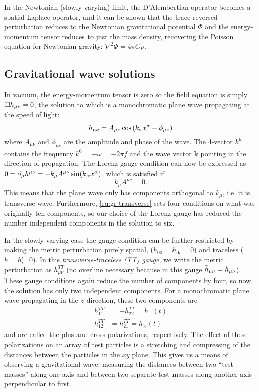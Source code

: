 In the Newtonian (slowly-varying) limit, the D'Alembertian operator becomes a spatial Laplace operator, and it can be shown that the trace-reversed perturbation reduces to the Newtonian gravitational potential $\Phi$ and the energy-momentum tensor reduces to just the mass density, recovering the Poisson equation for Newtonian gravity: $\nabla^2\Phi = 4\pi G\rho$.


\subsection{Gravitational wave solutions}

In vacuum, the energy-momentum tensor is zero so the field equation is simply $\Box\Bar{h}_{\mu\nu}=0$, the solution to which is a monochromatic plane wave propagating at the speed of light:
\begin{equation}
	\Bar{h}_{\mu\nu} = A_{\mu\nu}\cos\left(k_\sigma x^\sigma - \phi_{\mu\nu}\right)
\end{equation}
where $A_{\mu\nu}$ and $\phi_{\mu\nu}$ are the amplitude and phase of the wave.
The 4-vector $k^{\mu}$ contains the frequency $k^0 = -\omega = -2\pi f$ and the wave vector $\mathbf{k}$ pointing in the direction of propagation.
The Lorenz gauge condition can now be expressed as $0 = \partial_{\mu} \Bar{h}^{\mu\nu} = -k_{\mu} A^{\mu\nu} \sin (k_{\alpha} x^{\alpha})$, which is satisfied if
\begin{equation}\label{eq:gr-transverse}
	k_{\mu} A^{\mu\nu} = 0.
\end{equation}
This means that the plane wave only has components orthogonal to $k_{\mu}$, i.e. it is transverse wave.
Furthermore, \cref{eq:gr-transverse} sets four conditions on what was originally ten components, so our choice of the Lorenz gauge has reduced the number independent components in the solution to six.

In the slowly-varying case the gauge condition can be further restricted by making the metric perturbation purely spatial, ($h_{00}=h_{0i}=0$) and traceless ($h=h_i^i$=0).
In this \textit{transverse-traceless (TT) gauge}, we write the metric perturbation as $h_{\mu\nu}^{TT}$ (no overline necessary because in this gauge $\Bar{h}_{\mu\nu} = h_{\mu\nu}$).
These gauge conditions again reduce the number of components by four, so now the solution has only two independent components.
For a monochromatic plane wave propagating in the $z$ direction, these two components are
\begin{align}
	h_{11}^{TT} &= -h_{22}^{TT} = h_+(t) \\
	h_{12}^{TT} &= h_{21}^{TT} = h_{\times}(t)
\end{align}
and are called the plus and cross polarizations, respectively.
The effect of these polarizations on an array of test particles is a stretching and compressing of the distances between the particles in the $xy$ plane.
This gives us a means of observing a gravitational wave:
measuring the distances between two ``test masses'' along one axis and between two separate test masses along another axis perpendicular to first.

